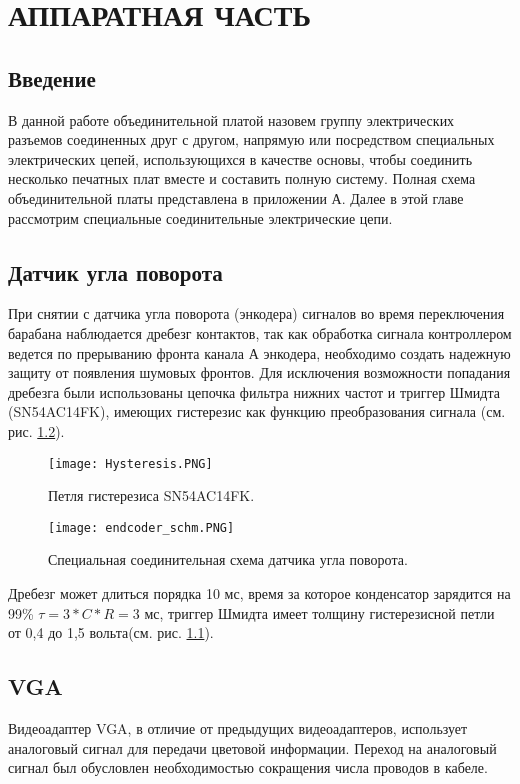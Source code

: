 \chapter{АППАРАТНАЯ ЧАСТЬ}
\section{Введение}

В данной работе объединительной платой назовем группу электрических разъемов соединенных друг с другом, напрямую или посредством специальных  электрических цепей, использующихся в качестве основы, чтобы соединить несколько печатных плат вместе и составить полную систему. Полная схема объединительной платы представлена в приложении А. Далее в этой главе рассмотрим специальные соединительные электрические цепи.

\section{Датчик угла поворота}

При снятии с датчика угла поворота (энкодера) сигналов во время переключения барабана наблюдается дребезг контактов, так как обработка сигнала контроллером ведется по прерыванию фронта канала А энкодера, необходимо создать надежную защиту от появления шумовых фронтов. Для исключения возможности попадания дребезга были использованы цепочка фильтра нижних частот и триггер Шмидта (SN54AC14FK), имеющих гистерезис как функцию преобразования сигнала (см. рис. \ref{fig:EndCSchm}).
\begin{figure}[ht]
	\centering
     \texttt{[image: Hysteresis.PNG]}
	\caption{Петля гистерезиса SN54AC14FK.}
	\label{fig:Hysteresis}
\end{figure}

\begin{figure}[ht]
	\centering
     \texttt{[image: endcoder\_schm.PNG]}
	\caption{Специальная соединительная схема датчика угла поворота.}
	\label{fig:EndCSchm}
\end{figure}
Дребезг может длиться порядка 10 мс, время за которое конденсатор зарядится на 99\% $ \tau=3*C*R=3 $ мс, триггер Шмидта имеет толщину гистерезисной петли от 0,4 до 1,5 вольта(см. рис. \ref{fig:Hysteresis}). 

\section{VGA}

Видеоадаптер VGA, в отличие от предыдущих видеоадаптеров, использует аналоговый сигнал для передачи цветовой информации. Переход на аналоговый сигнал был обусловлен необходимостью сокращения числа проводов в кабеле. 

